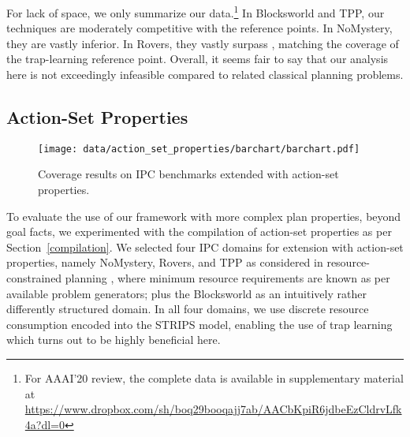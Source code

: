 For lack of space, we only summarize our data.\footnote{For AAAI'20
review, the complete data is available in supplementary material at
{\scriptsize \url{https://www.dropbox.com/sh/boq29booqajj7ab/AACbKpiR6jdbeEzCldrvLfk4a?dl=0}}}
%
%
In Blocksworld and TPP, our techniques are moderately competitive with
the reference points. In NoMystery, they are vastly inferior. In
Rovers, they vastly surpass \hlmcut, matching the coverage of the
trap-learning reference point. Overall, it seems fair to say that our
analysis here is not exceedingly infeasible compared to related
classical planning problems.




\fi









\ifdefined\suppflagdefined

\subsection{Action-Set Properties}

\begin{figure*}[htb]
\centering\centering
%
\texttt{[image: data/action\_set\_properties/barchart/barchart.pdf]}
\vspace{-0.6cm}
\caption{Coverage results on IPC benchmarks extended with action-set properties.}
\label{fig:barcharts}
\vspace{-0.2cm}
\end{figure*}

To evaluate the use of our framework with more complex plan
properties, beyond goal facts, we experimented with the compilation of
action-set properties as per Section~\ref{compilation}. We selected
four IPC domains for extension with action-set properties, namely
NoMystery, Rovers, and TPP as considered in resource-constrained
planning \cite{nakhost:etal:icaps-12}, where minimum resource
requirements are known as per available problem generators; plus the
Blocksworld as an intuitively rather differently structured domain. In
all four domains, we use discrete resource consumption encoded into
the STRIPS model, enabling the use of trap
learning \cite{steinmetz:hoffmann:ijcai-17} which turns out to be
highly beneficial here.

